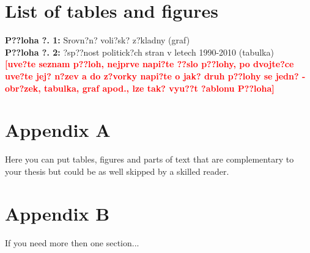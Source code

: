 \newpage
\section*{List of tables and figures}

\noindent \textbf{P??loha ?. 1:} Srovn?n? voli?sk? z?kladny (graf)\\
\noindent \textbf{P??loha ?. 2:} ?sp??nost politick?ch stran v
letech
1990-2010 (tabulka)\\
\noindent \textbf{\textcolor{red}{[uve?te seznam p??loh, nejprve
napi?te ??slo p??lohy, po dvojte?ce uve?te jej? n?zev a do z?vorky
napi?te o jak? druh p??lohy se jedn? - obr?zek, tabulka, graf apod.,
lze tak? vyu??t ?ablonu P??loha]}}

\newpage
\section*{Appendix A}

Here you can put tables, figures and parts of text that are
complementary to your thesis but could be as well skipped by a
skilled reader.

\section*{Appendix B}

If you need more then one section...
